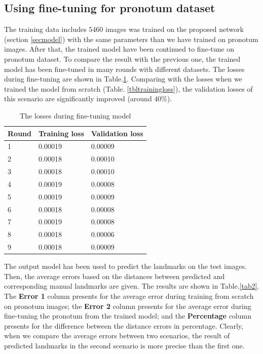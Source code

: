 \documentclass[10pt]{article}
\begin{document}
\subsection{Using fine-tuning for pronotum dataset}
The training data includes $5460$ images was trained on the proposed network (section \ref{secmodel}) with the same parameters than we have trained on pronotum images. After that, the trained model have been continued to fine-tune on pronotum dataset. To compare the result with the previous one, the trained model has been fine-tuned in many rounds with different datasets. The losses during fine-tuning are shown in Table.\ref{tblfinetuningloss}. Comparing with the losses when we trained the model from scratch (Table. \ref{tbltrainingloss}), the validation losses of this scenario are significantly improved (around $40\%$).
\begin{table}[h!]
	\centering
	\begin{tabular}{l l l}
	Round & Training loss & Validation loss \\ \hline
	1 & 0.00019 & 0.00009  \\ \hline
	2 & 0.00018 & 0.00010 \\ \hline
	3 & 0.00018 & 0.00010 \\ \hline
	4 & 0.00019 & 0.00008 \\ \hline
	5 & 0.00019 & 0.00009 \\ \hline
	6 & 0.00018 & 0.00008 \\ \hline
	7 & 0.00019 & 0.00008 \\ \hline
	8 & 0.00018 & 0.00006 \\ \hline
	9 & 0.00018 & 0.00009 \\ \hline
	\end{tabular}
	\caption{The losses during fine-tuning model}
	\label{tblfinetuningloss}
\end{table}

The output model has been used to predict the landmarks on the test images. Then, the average errors based on the distances between predicted and corresponding manual landmarks are given. The results are shown in Table.\ref{tab2}. The \textbf{Error 1} column presents for the average error during training from scratch on pronotum images; the \textbf{Error 2} column presents for the average error during fine-tuning the pronotum from the trained model; and the \textbf{Percentage} column presents for the difference between the distance errors in percentage. Clearly, when we compare the average errors between two scenarios, the result of predicted landmarks in the second scenario is more precise than the first one.
\end{document}
